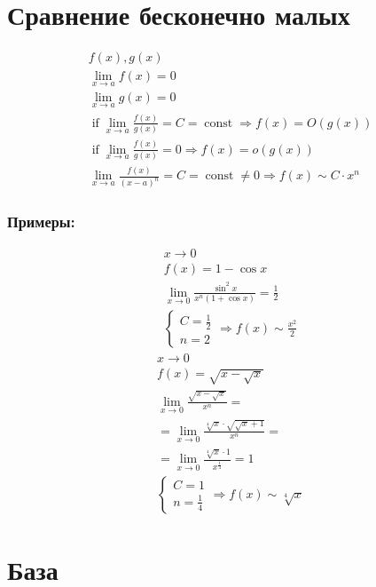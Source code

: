\documentclass{article}
\DeclareMathOperator*{\If}{if}
\DeclareMathOperator*{\Const}{const}
\begin{document}
\section{Сравнение бесконечно малых}

\begin{gather*}
	f(x), g(x) \\
	\lim_{x \to a} f(x) = 0 \\
	\lim_{x \to a} g(x) = 0 \\
	\If \lim_{x \to a} \frac{f(x)}{g(x)} = C = \Const
	\Rightarrow f(x) = O(g(x)) \\
	\If \lim_{x \to a} \frac{f(x)}{g(x)} = 0
	\Rightarrow f(x) = o(g(x)) \\
	\lim_{x \to a} \frac{f(x)}{(x - a)^n} = C = \Const \ne 0
	\Rightarrow f(x) \sim C \cdot x^n
\end{gather*}

\subsubsection*{Примеры:}

\begin{gather*}
	x \to 0 \\
	f(x) = 1 - \cos x \\
	\lim_{x \to 0} \frac{\sin^2 x}{x^n(1 + \cos x)} = \frac{1}{2} \\
	\begin{cases}
		C = \frac{1}{2} \\
		n = 2
	\end{cases}
	\Rightarrow f(x) \sim \frac{x^2}{2}
\end{gather*}
\begin{gather*}
	x \to 0 \\
	f(x) = \sqrt{x - \sqrt{x}} \\
	\lim_{x \to 0} \frac{\sqrt{x - \sqrt{x}}}{x^n} = \\
	= \lim_{x \to 0} \frac{\sqrt[4]{x} \cdot \sqrt{\sqrt{x} + 1}}{x^n} = \\
	= \lim_{x \to 0} \frac{\sqrt[4]{x} \cdot 1}{x^{\frac{1}{4}}} = 1 \\
	\begin{cases}
		C = 1 \\
		n = \frac{1}{4}
	\end{cases}
	\Rightarrow f(x) \sim \sqrt[4]{x}
\end{gather*}

\section{База}
\end{document}
